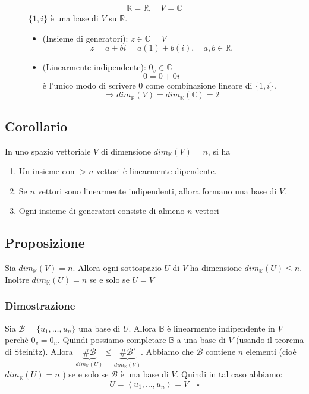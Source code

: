\documentclass[a4paper]{article}
\theoremstyle{break}
\theoremstyle{break}
\theoremstyle{break}
\theoremstyle{break}
\begin{document}
\begin{figure}[H]
  \begin{example}
    \[
    \mathbb{K} = \mathbb{R}, \quad V = \mathbb{C}
    \] 
    \( \{1, i\}  \) è una base di \( V \) su \( \mathbb{R} \).
    \begin{itemize}
      \item (Insieme di generatori): \( z \in \mathbb{C} = V \) 
        \[
        z = a + bi = a(1) + b(i), \quad a,b \in \mathbb{R}. 
        \] 
      \item (Linearmente indipendente): \( 0_v \in \mathbb{C} \) 
        \[
        0 = 0 + 0i
        \] 
        è l'unico modo di scrivere \( 0 \) come combinazione lineare di \( \{1,i\}  \).
        \[
          \Rightarrow dim_{\mathbb{K}}(V) = dim_{\mathbb{R}}(\mathbb{C}) = 2
        \] 
    \end{itemize}
  \end{example}
\end{figure}

\subsection{Corollario}
\label{6.12}
In uno spazio vettoriale \( V \) di dimensione \( dim_{\mathbb{K}}(V) = n \), si ha
\begin{enumerate}
  \item Un insieme con \( > n \) vettori è linearmente dipendente.
  \item Se \( n \) vettori sono linearmente indipendenti, allora formano una base di
    \( V \).
  \item Ogni insieme di generatori consiste di almeno \( n \) vettori
\end{enumerate}

\subsection{Proposizione}
Sia \( dim_{\mathbb{K}}(V) = n \). Allora ogni sottospazio \( U \) di \( V \) ha dimensione
\( dim_{\mathbb{K}}(U) \le n \). Inoltre \( dim_{\mathbb{K}}(U) = n \) se e solo se
\( U = V \) 

\subsubsection{Dimostrazione}
Sia \( \mathcal{B} = \{u_1, \ldots, u_n\}  \) una base di \( U \). Allora \( \mathbb{B} \) 
è linearmente indipendente in \( V \) perchè \( 0_v = 0_u \).
Quindi possiamo completare \( \mathbb{B} \) a una base di \( V \) (usando il teorema
di Steinitz). Allora \( \underbrace{\#\mathcal{B}}_{dim_{\mathbb{K}}(U)} \le 
\underbrace{\#\mathcal{B}'}_{dim_{\mathbb{K}}(V)} \).
Abbiamo che \( \mathcal{B} \) contiene \( n \) elementi (cioè \( dim_{\mathbb{K}}(U) = n \) )
se e solo se \( \mathcal{B} \) è una base di \( V \). Quindi in tal caso
abbiamo:
\[
U = \left< u_1, \ldots, u_n \right> = V \quad \square
\] 
\end{document}
